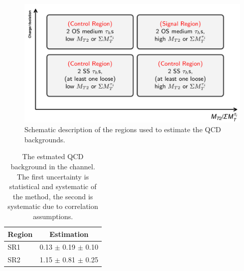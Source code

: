 \begin{figure}[!Hhtb]
\centering
\includegraphics[angle=0,scale=0.30]{Bkg/ABCD.png}
\caption{Schematic description of the regions used to estimate the QCD backgrounds.}
\label{fig:ABCDQCD}
\end{figure}



\begin{table}[!Hhtb]
\begin{center}
\begin{tabular}{|l|c|}
\hline\hline
 Region      &  Estimation\\
\hline\hline
SR1      & 0.13 $\pm$ 0.19 $\pm$ 0.10 \\
\hline
SR2      & 1.15 $\pm$ 0.81 $\pm$ 0.25  \\
\hline\hline
\end{tabular}
\caption{The estmated QCD background in the \tauTau channel. The first uncertainty is statistical and systematic of the method, the second is systematic due to correlation assumptions.}
\label{4QCDbg}
\end{center}
\end{table}

